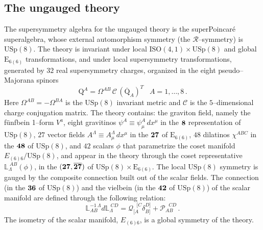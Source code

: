 \documentclass[a4paper,12pt]{article}
\begin{document}
\subsection{The ungauged theory}
The supersymmetry algebra for the ungauged theory is the
superPoincar\'e superalgebra, whose external automorphism
symmetry (the $\mathcal{R}$--symmetry) is $\mathrm{USp(8)}$. The
theory is invariant under local $\mathrm{ISO(4,1)}\times \mathrm{USp(8)}$ and
global $\mathrm{E_{6(6)}}$ transformations,
and under local supersymmetry transformations, generated by $32$ real
supersymmetry charges, organized in the eight pseudo--Majorana spinors
\begin{equation}
\mathrm{Q}^A=\Omega^{AB} \, \mathcal{C} \, \left( \overline{\mathrm{Q}}_A\right) ^T \,
 ~~~A=1,\dots,8\,.
\end{equation}
Here $\Omega^{AB}=-\Omega^{BA}$ is the $\mathrm{USp(8)}$ invariant
metric and $ \mathcal{C}$ is the $5$--dimensional charge conjugation matrix.
The theory contains: the graviton field, namely the f\"unfbein 1--form $V^a$,
eight gravitinos $\psi^A \equiv \psi^A_\mu \, dx^\mu$ in the
$\bf 8$ representation of $\mathrm{USp(8)}$, $27$ vector fields
 $A^{\Lambda} \equiv A^{\Lambda} _\mu \, dx^\mu$ in the $\bf 27$ of
 $\mathrm{E_{6(6)}}$,
$48$ dilatinos $\chi^{ABC}$ in the $\bf 48$ of $\mathrm{USp(8)}$, and $42$ scalars
$\phi$ that
parametrize the coset manifold $E_{\left(6\right)6}/\mathrm{USp(8)}$, and
appear in the theory through the coset representative $\mathbb{L}_{\Lambda}^{~AB}(\phi)$, in the
$\bf (27,\overline{{27}})$ of $\mathrm{USp(8)}\times \mathrm{E_{6(6)}}$.
The local $\mathrm{USp(8)}$ symmetry is gauged by the composite connection
built out of the scalar fields. The connection (in the ${\bf 36}$ of $\mathrm{USp(8)}$)
and the vielbein (in the ${\bf 42}$ of $\mathrm{USp(8)}$) of the
scalar manifold are defined through the following relation:
\begin{equation}
\mathbb{L}^{-1~\Lambda}_{AB}d\mathbb{L}_{\Lambda}^{~CD}=
\mathcal{Q}_{[A}^{~~~[C}\delta^{D]}_{B]}+\mathcal{P}_{AB}^{~~~CD}\,.
\label{defungaugedconnection}
\end{equation}
The isometry of the scalar manifold, $E_{\left(6\right)6}$, is a global symmetry of
the theory.
\end{document}
